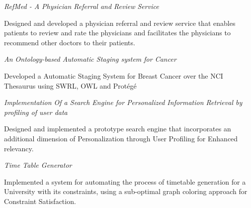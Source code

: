 \documentclass[10pt]{article}
\newcommand{\spc}{\vspace{1.2mm}}
\begin{document}

\textit{RefMed - A Physician Referral and Review Service}
\begin{compactitem}
\item {Designed and developed a physician referral and review service that enables patients to review and rate the physicians and facilitates the physicians to recommend other doctors to their patients.}
\end{compactitem}
\spc
\textit{An Ontology-based Automatic Staging system for Cancer}
\begin{compactitem}
\item {Developed a Automatic Staging System for Breast Cancer over the NCI Thesaurus using SWRL, OWL and Prot\'{e}g\'{e}}
\end{compactitem}
\spc
\textit{Implementation Of a Search Engine for Personalized Information Retrieval by profiling of user data}
\begin{compactitem}
\item Designed and implemented  a prototype search engine that incorporates an additional dimension of Personalization through User Profiling for Enhanced relevancy.
\end{compactitem}
\spc
\textit{Time Table Generator}
\begin{compactitem}
\item Implemented a system for automating the process of timetable generation for a University with its constraints, using a sub-optimal graph coloring approach for Constraint Satisfaction.
\end{compactitem}
\spc
\end{document}

